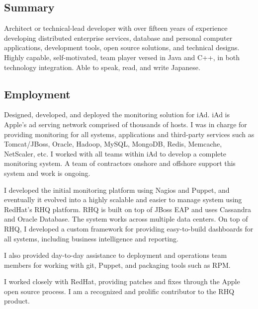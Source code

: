 \documentclass{article}
\begin{document}
\address{
1025 NE 73RD Street - Seattle WA 98115 - USA - 425-466-8702 \\
http://www.noderunner.net/\%7Egenman/ - genman@noderunner.net }


\subsection{Summary}
Architect or technical-lead developer with over fifteen years of experience
developing distributed enterprise services, database and personal computer
applications, development tools, open source solutions, and technical designs.
Highly capable, self-motivated, team player versed in Java and C++, in both
technology integration. Able to speak, read, and write Japanese.

\subsection{Employment}

 

Designed, developed, and deployed the monitoring solution for iAd. iAd
is Apple's ad serving network comprised of thousands of hosts. I was
in charge for providing monitoring for all systems, applications and
third-party services such as Tomcat/JBoss, Oracle, Hadoop, MySQL, MongoDB,
Redis, Memcache, NetScaler, etc. I worked with all teams within iAd to
develop a complete monitoring system. A team of contractors onshore and
offshore support this system and work is ongoing.

I developed the initial monitoring platform using Nagios and Puppet,
and eventually it evolved into a highly scalable and easier to manage
system using RedHat's RHQ platform. RHQ is built on top of JBoss EAP
and uses Cassandra and Oracle Database. The system works across multiple
data centers. On top of RHQ, I developed a custom framework for providing
easy-to-build dashboards for all systems, including business intelligence
and reporting.

I also provided day-to-day assistance to deployment and operations team
members for working with git, Puppet, and packaging tools such as RPM.

I worked closely with RedHat, providing patches and fixes through the
Apple open source process. I am a recognized and prolific contributor
to the RHQ product.
\end{document}
